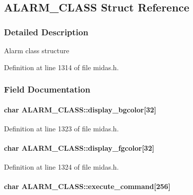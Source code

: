 \subsection{ALARM\_\-CLASS Struct Reference}
\label{structALARM__CLASS}


\subsubsection{Detailed Description}
Alarm class structure 

Definition at line 1314 of file midas.h.

\subsubsection{Field Documentation}
\paragraph[{display\_\-bgcolor}]{\setlength{\rightskip}{0pt plus 5cm}char {\bf ALARM\_\-CLASS::display\_\-bgcolor}\mbox{[}32\mbox{]}}\hfill\label{structALARM__CLASS_adbe89b6d474b7b0fdd9479e76d812b75}


Definition at line 1323 of file midas.h.
\paragraph[{display\_\-fgcolor}]{\setlength{\rightskip}{0pt plus 5cm}char {\bf ALARM\_\-CLASS::display\_\-fgcolor}\mbox{[}32\mbox{]}}\hfill\label{structALARM__CLASS_a073f45a988563de271a06aa8012a5c37}


Definition at line 1324 of file midas.h.
\paragraph[{execute\_\-command}]{\setlength{\rightskip}{0pt plus 5cm}char {\bf ALARM\_\-CLASS::execute\_\-command}\mbox{[}256\mbox{]}}\hfill\label{structALARM__CLASS_a8ecd57de94ffa8d60e874723234e0db9}


